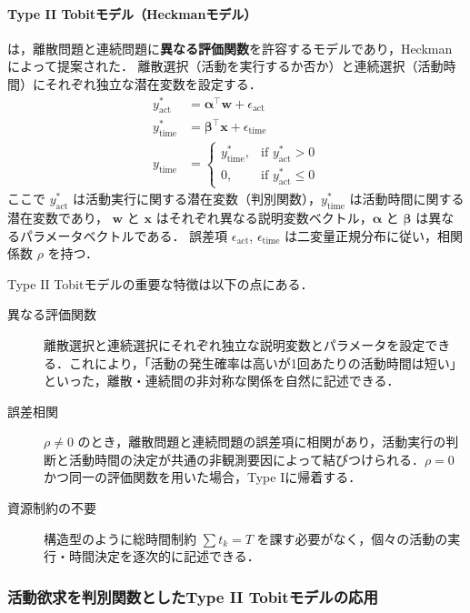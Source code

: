 \paragraph{Type II Tobitモデル（Heckmanモデル）}は，離散問題と連続問題に\textbf{異なる評価関数}を許容するモデルであり，Heckman \cite{Heckman1979} によって提案された．
離散選択（活動を実行するか否か）と連続選択（活動時間）にそれぞれ独立な潜在変数を設定する．
\begin{align}
  y^*_{\mathrm{act}} &= \bm{\alpha}^\top \bm{w} + \epsilon_{\mathrm{act}} \label{eq:tobit2_discrete} \\
  y^*_{\mathrm{time}} &= \bm{\beta}^\top \bm{x} + \epsilon_{\mathrm{time}} \label{eq:tobit2_continuous} \\
  y_{\mathrm{time}} &= \begin{cases} y^*_{\mathrm{time}}, & \text{if } y^*_{\mathrm{act}} > 0 \\ 0, & \text{if } y^*_{\mathrm{act}} \leq 0 \end{cases} \label{eq:tobit2_observe}
\end{align}
ここで $y^*_{\mathrm{act}}$ は活動実行に関する潜在変数（判別関数），$y^*_{\mathrm{time}}$ は活動時間に関する潜在変数であり，
$\bm{w}$ と $\bm{x}$ はそれぞれ異なる説明変数ベクトル，$\bm{\alpha}$ と $\bm{\beta}$ は異なるパラメータベクトルである．
誤差項 $\epsilon_{\mathrm{act}}$, $\epsilon_{\mathrm{time}}$ は二変量正規分布に従い，相関係数 $\rho$ を持つ．

Type II Tobitモデルの重要な特徴は以下の点にある．
\begin{description}
  \item[異なる評価関数]
    離散選択と連続選択にそれぞれ独立な説明変数とパラメータを設定できる．これにより，「活動の発生確率は高いが1回あたりの活動時間は短い」といった，離散・連続間の非対称な関係を自然に記述できる．
  \item[誤差相関]
    $\rho \neq 0$ のとき，離散問題と連続問題の誤差項に相関があり，活動実行の判断と活動時間の決定が共通の非観測要因によって結びつけられる．$\rho = 0$ かつ同一の評価関数を用いた場合，Type Iに帰着する．
  \item[資源制約の不要]
    構造型のように総時間制約 $\sum t_k = T$ を課す必要がなく，個々の活動の実行・時間決定を逐次的に記述できる．
\end{description}

\subsubsection{活動欲求を判別関数としたType II Tobitモデルの応用}\label{sssec:tobit_activity_needs}

